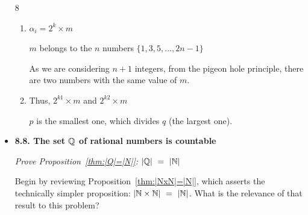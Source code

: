\begin{itemize}
8
\medskip


\begin{enumerate}
\item
 $\alpha_i = 2^k \times m$ 
 
$m$ belongs to the $n$ numbers $\{1,3,5, \ldots, 2n-1 \}$

As we are considering $n+1$ integers, from the pigeon hole principle, there are two numbers with the same value of $m$. 
\item 
Thus, $2^{k1} \times m$ and $2^{k2} \times m$

$p$ is the smallest one, which divides $q$ (the largest one).
\end{enumerate}


\medskip\item

{\bf 8.8. The set $\mathbb{Q}$ of rational numbers is countable}

{\em Prove Proposition~\ref{thm:|Q|=|N|}: $|\mathbb{Q}| \ = \ |\mathbb{N}|$}

\smallskip

Begin by reviewing Proposition~\ref{thm:|NxN|=|N|}, which asserts the technically simpler proposition: $|\mathbb{N} \times \mathbb{N}| \ = \ |\mathbb{N}|$.  What is the relevance of that result to this problem?

\end{itemize}



